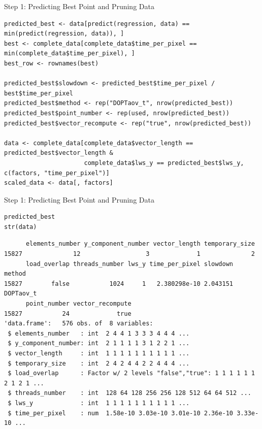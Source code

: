 \documentclass[10pt, compress, aspectratio=169, xcolor={table,usenames,dvipsnames}]{beamer}
\begin{document}
\begin{frame}[fragile,label={sec:orgc39df2a}]{Step 1: Predicting Best Point and Pruning Data}
 \lstset{language=r,label= ,caption= ,captionpos=b,numbers=none}
\begin{lstlisting}
predicted_best <- data[predict(regression, data) == min(predict(regression, data)), ]
best <- complete_data[complete_data$time_per_pixel == min(complete_data$time_per_pixel), ]
best_row <- rownames(best)

predicted_best$slowdown <- predicted_best$time_per_pixel / best$time_per_pixel
predicted_best$method <- rep("DOPTaov_t", nrow(predicted_best))
predicted_best$point_number <- rep(used, nrow(predicted_best))
predicted_best$vector_recompute <- rep("true", nrow(predicted_best))

data <- complete_data[complete_data$vector_length == predicted_best$vector_length &
                      complete_data$lws_y == predicted_best$lws_y, c(factors, "time_per_pixel")]
scaled_data <- data[, factors]
\end{lstlisting}
\end{frame}
\begin{frame}[fragile,label={sec:org72c30df}]{Step 1: Predicting Best Point and Pruning Data}
 \scriptsize
\lstset{language=r,label= ,caption= ,captionpos=b,numbers=none}
\begin{lstlisting}
predicted_best
str(data)
\end{lstlisting}

\begin{verbatim}
      elements_number y_component_number vector_length temporary_size
15827              12                  3             1              2
      load_overlap threads_number lws_y time_per_pixel slowdown    method
15827        false           1024     1   2.380298e-10 2.043151 DOPTaov_t
      point_number vector_recompute
15827           24             true
'data.frame':	576 obs. of  8 variables:
 $ elements_number   : int  2 4 4 1 3 3 3 4 4 4 ...
 $ y_component_number: int  2 1 1 1 1 3 1 2 2 1 ...
 $ vector_length     : int  1 1 1 1 1 1 1 1 1 1 ...
 $ temporary_size    : int  2 4 2 4 4 2 2 4 4 4 ...
 $ load_overlap      : Factor w/ 2 levels "false","true": 1 1 1 1 1 1 2 1 2 1 ...
 $ threads_number    : int  128 64 128 256 256 128 512 64 64 512 ...
 $ lws_y             : int  1 1 1 1 1 1 1 1 1 1 ...
 $ time_per_pixel    : num  1.58e-10 3.03e-10 3.01e-10 2.36e-10 3.33e-10 ...
\end{verbatim}
\normalsize
\end{frame}
\end{document}
